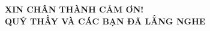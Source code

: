 \documentclass[aspectratio=169, 10pt]{beamer}
\begin{document}
\begin{frame}[plain]
  \centering
  \vspace{1.8cm}
  {\LARGE \textbf{XIN CHÂN THÀNH CẢM ƠN!}}\\[0.3cm]
  {\large \textbf{QUÝ THẦY VÀ CÁC BẠN ĐÃ LẮNG NGHE}}\\[1.0cm]
\end{frame}
\end{document}
